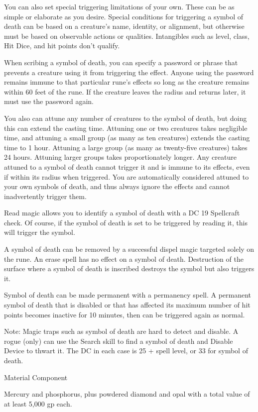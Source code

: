{	You can also set special triggering limitations of your own. These can be as simple or elaborate as you desire. Special conditions for triggering a symbol of death can be based on a creature's name, identity, or alignment, but otherwise must be based on observable actions or qualities. Intangibles such as level, class, Hit Dice, and hit points don't qualify.


	When scribing a symbol of death, you can specify a password or phrase that prevents a creature using it from triggering the effect. Anyone using the password remains immune to that particular rune's effects so long as the creature remains within 60 feet of the rune. If the creature leaves the radius and returns later, it must use the password again.


	You also can attune any number of creatures to the symbol of death, but doing this can extend the casting time. Attuning one or two creatures takes negligible time, and attuning a small group (as many as ten creatures) extends the casting time to 1 hour. Attuning a large group (as many as twenty-five creatures) takes 24 hours. Attuning larger groups takes proportionately longer. Any creature attuned to a symbol of death cannot trigger it and is immune to its effects, even if within its radius when triggered. You are automatically considered attuned to your own symbols of death, and thus always ignore the effects and cannot inadvertently trigger them.


Read magic allows you to identify a symbol of death with a DC 19 Spellcraft check. Of course, if the symbol of death is set to be triggered by reading it, this will trigger the symbol.


	A symbol of death can be removed by a successful dispel magic targeted solely on the rune. An erase spell has no effect on a symbol of death. Destruction of the surface where a symbol of death is inscribed destroys the symbol but also triggers it.


	Symbol of death can be made permanent with a permanency spell. A permanent symbol of death that is disabled or that has affected its maximum number of hit points becomes inactive for 10 minutes, then can be triggered again as normal.


Note: Magic traps such as symbol of death are hard to detect and disable. A rogue (only) can use the Search skill to find a symbol of death and Disable Device to thwart it. The DC in each case is 25 + spell level, or 33 for symbol of death.

Material Component

	Mercury and phosphorus, plus powdered diamond and opal with a total value of at least 5,000 gp each.
}
        
